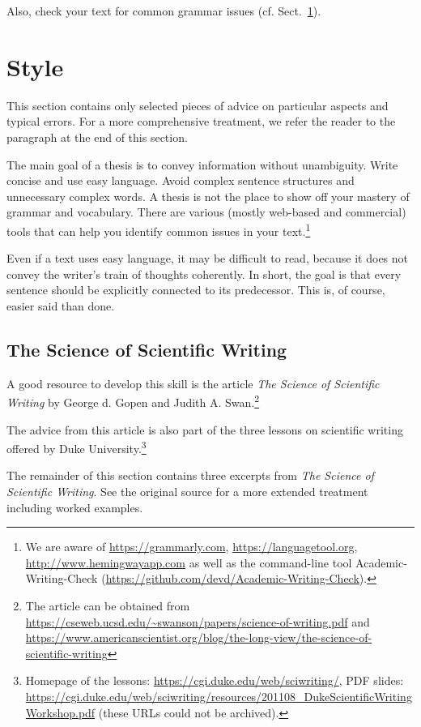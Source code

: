 Also, check your text for common grammar issues (cf. Sect.~\ref{sec:style}).

\section{Style}
\label{sec:style}

This section contains only selected pieces of advice on particular aspects and typical errors. For a more comprehensive treatment, we refer the reader to the paragraph  at the end of this section.

The main goal of a thesis is to convey information without unambiguity. Write concise and use easy language. Avoid complex sentence structures and unnecessary complex words. A thesis is not the place to show off your mastery of grammar and vocabulary. There are various (mostly web-based and commercial) tools that can help you identify common issues in your text.\footnote{We are aware of \url{https://grammarly.com}, \url{https://languagetool.org}, \url{http://www.hemingwayapp.com} as well as the command-line tool Academic-Writing-Check (\url{https://github.com/devd/Academic-Writing-Check}).}

Even if a text uses easy language, it may be difficult to read, because it does not convey the writer's train of thoughts coherently. In short, the goal is that every sentence should be explicitly connected to its predecessor. This is, of course, easier said than done.

\subsection{The Science of Scientific Writing}

A good resource to develop this skill is the article \emph{The Science of Scientific Writing} by George d. Gopen and Judith A. Swan.\footnote{The article can be obtained from \url{https://cseweb.ucsd.edu/~swanson/papers/science-of-writing.pdf} and \url{https://www.americanscientist.org/blog/the-long-view/the-science-of-scientific-writing}} 

The advice from this article is also part of the three lessons on scientific writing offered by Duke University.\footnote{Homepage of the lessons: \url{https://cgi.duke.edu/web/sciwriting/}, PDF slides: \url{https://cgi.duke.edu/web/sciwriting/resources/201108_DukeScientificWritingWorkshop.pdf} (these URLs could not be archived).}

The remainder of this section contains three excerpts from \emph{The Science of Scientific Writing}. See the original source for a more extended treatment including worked examples.

